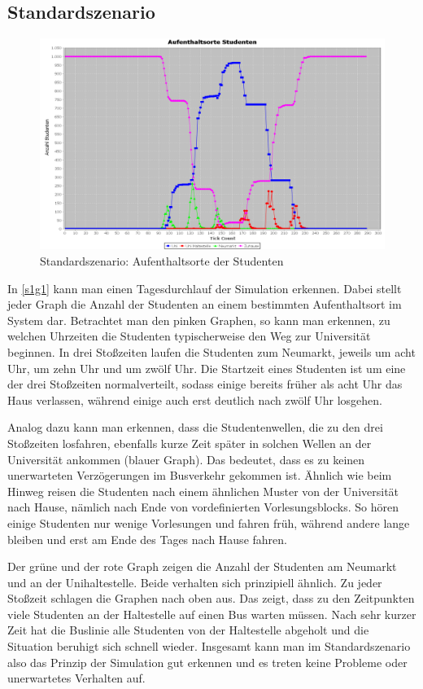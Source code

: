 \documentclass[12pt,a4paper]{scrartcl}
\begin{document}
\subsection{Standardszenario}\label{s1}
\begin{figure}
\includegraphics[scale=0.4]{Standardszenario_Aufenthaltsorte.png}
\caption{Standardszenario: Aufenthaltsorte der Studenten}
\label{s1g1}
\end{figure}

In \autoref{s1g1} kann man einen Tagesdurchlauf der Simulation erkennen. Dabei stellt jeder Graph die Anzahl der Studenten an einem bestimmten Aufenthaltsort im System dar. Betrachtet man den pinken Graphen, so kann man erkennen, zu welchen Uhrzeiten die Studenten typischerweise den Weg zur Universität beginnen. In drei Stoßzeiten laufen die Studenten zum Neumarkt, jeweils um acht Uhr, um zehn Uhr und um zwölf Uhr. Die Startzeit eines Studenten ist um eine der drei Stoßzeiten normalverteilt, sodass einige bereits früher als acht Uhr das Haus verlassen, während einige auch erst deutlich nach zwölf Uhr losgehen. 

Analog dazu kann man erkennen, dass die Studentenwellen, die zu den drei Stoßzeiten losfahren, ebenfalls kurze Zeit später in solchen Wellen an der Universität ankommen (blauer Graph). Das bedeutet, dass es zu keinen unerwarteten Verzögerungen im Busverkehr gekommen ist. Ähnlich wie beim Hinweg reisen die Studenten nach einem ähnlichen Muster von der Universität nach Hause, nämlich nach Ende von vordefinierten Vorlesungsblocks. So hören einige Studenten nur wenige Vorlesungen und fahren früh, während andere lange bleiben und erst am Ende des Tages nach Hause fahren. 

Der grüne und der rote Graph zeigen die Anzahl der Studenten am Neumarkt und an der Unihaltestelle. Beide verhalten sich prinzipiell ähnlich. Zu jeder Stoßzeit schlagen die Graphen nach oben aus. Das zeigt, dass zu den Zeitpunkten viele Studenten an der Haltestelle auf einen Bus warten müssen. Nach sehr kurzer Zeit hat die Buslinie alle Studenten von der Haltestelle abgeholt und die Situation beruhigt sich schnell wieder.
Insgesamt kann man im Standardszenario also das Prinzip der Simulation gut erkennen und es treten keine Probleme oder unerwartetes Verhalten auf.
\end{document}
